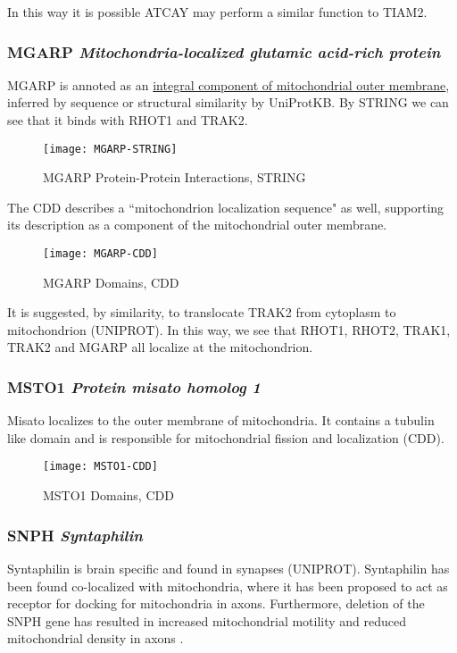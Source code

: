 In this way it is possible ATCAY may perform a similar function to TIAM2.

\subsubsection{MGARP \textit{Mitochondria-localized glutamic acid-rich protein}}

MGARP is annoted as an
\href{http://www.ebi.ac.uk/QuickGO/GTerm?id=GO:0031307}{integral component of
mitochondrial outer membrane}, inferred by sequence or structural similarity by
UniProtKB. By STRING we can see that it binds with RHOT1 and TRAK2.

\begin{figure}[h!]
  \centering
  \texttt{[image: MGARP-STRING]}
  \caption{MGARP Protein-Protein Interactions, STRING}
\end{figure}

The CDD describes a ``mitochondrion localization sequence" as well, supporting
its description as a component of the mitochondrial outer membrane.

\begin{figure}[h!]
  \texttt{[image: MGARP-CDD]}
  \caption{MGARP Domains, CDD}
\end{figure}

It is suggested, by similarity, to translocate TRAK2 from cytoplasm to
mitochondrion (UNIPROT). In this way, we see that RHOT1, RHOT2, TRAK1, TRAK2 and
MGARP all localize at the mitochondrion.

\subsubsection{MSTO1 \textit{Protein misato homolog 1}}

Misato localizes to the outer membrane of mitochondria. It contains a tubulin
like domain and is responsible for mitochondrial fission and localization (CDD).

\begin{figure}[h!]
  \texttt{[image: MSTO1-CDD]}
  \caption{MSTO1 Domains, CDD}
\end{figure}

\subsubsection{SNPH \textit{Syntaphilin}}

Syntaphilin is brain specific and found in synapses (UNIPROT). Syntaphilin
has been found co-localized with mitochondria, where it has been proposed
to act as receptor for docking for mitochondria in axons. Furthermore, deletion
of the SNPH gene has resulted in increased mitochondrial motility and reduced
mitochondrial density in axons \citep{Reis2009}.

